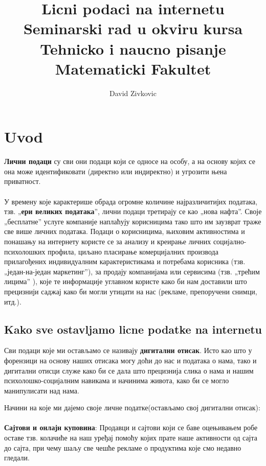 \documentclass[a4paper]{article}
\title{Licni podaci na internetu\\ \small Seminarski rad u okviru kursa\\Tehnicko i naucno pisanje\\ Matematicki Fakultet}
\author{David Zivkovic}
\begin{document}
\maketitle
\date

\tableofcontents

\newpage

\section{Uvod}
\label{sec:uvod}
\textbf{Лични подаци} су сви они подаци који се односе на особу, а на основу којих се она може идентификовати (директно или индиректно) и угрозити њена приватност.
\paragraph{}
У времену које карактерише обрада огромне количине најразличитијих података, тзв. „\textbf{ери великих података}”, лични подаци третирају се као „нова нафта”. Своје „бесплатне” услуге компаније наплаћују корисницима тако што им заузврат траже све више личних података. Подаци о корисницима, њиховим активностима и понашању на интернету користе се за анализу и креирање личних социјално-психолошких профила, циљано пласирање комерцијалних производа прилагођених индивидуалним карактеристикама и потребама корисника (тзв. „један-на-један маркетинг”), за продају компанијама или сервисима (тзв. „трећим лицима” \cite{third party}), које те информације углавном користе како би нам доставили што прецизнији саджај како би могли утицати на нас (рекламе, препоручени снимци, итд.).

\subsection{Kako sve ostavljamo licne podatke na internetu}

Сви подаци које ми остављамо се називају \textbf{дигитални отисак}\cite{3rd party}. Исто као што у форензици на основу наших отисака могу доћи до нас и података о нама, тако и дигитални отисци служе како би се дала што прецизнија слика о нама и нашим психолошко-социјалним навикама и начинима живота, како би се могло манипулисати над нама.

Начини на које ми дајемо своје личне податке(остављамо свој дигитални отисак):
\paragraph{}
\textbf{Сајтови и онлајн куповина}:
Продавци и сајтови који се баве оцењивањем робе оставе тзв. колачиће на наш уређај помоћу којих прате наше активности од сајта до сајта, при чему шаљу све чешће рекламе о продуктима које смо недавно гледали.
\end{document}
